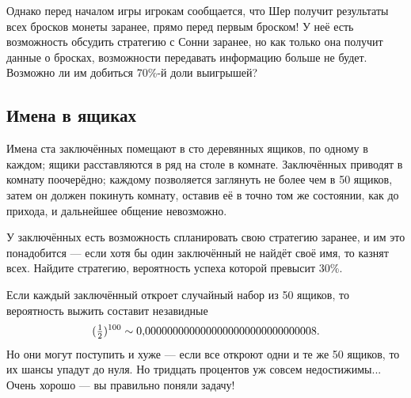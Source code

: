 Однако перед началом игры игрокам сообщается, что Шер получит результаты всех бросков монеты заранее, прямо перед первым броском!
У неё есть возможность обсудить стратегию с Сонни заранее, но как только она получит данные о бросках, возможности передавать информацию больше не будет.
Возможно ли им добиться 70\%-й доли выигрышей?

\subsection*{Имена в ящиках}\label{Имена в ящиках}

Имена ста заключённых помещают в сто деревянных ящиков, по одному в каждом;
ящики расставляются в ряд на столе в комнате.
Заключённых приводят в комнату поочерёдно;
каждому позволяется заглянуть не более чем в 50 ящиков,
затем он должен покинуть комнату, оставив её в точно том же состоянии, как до прихода, и дальнейшее общение невозможно.

У заключённых есть возможность спланировать свою стратегию заранее, и им это понадобится --- если хотя бы один заключённый не найдёт своё имя, то казнят всех.
Найдите стратегию, вероятность успеха которой превысит 30\%.

 Если каждый заключённый откроет случайный набор из 50 ящиков, то вероятность выжить составит незавидные
\[(\tfrac12)^{100}\z\sim 0{,}0000000000000000000000000000008.\]
Но они могут поступить и хуже --- если все откроют одни и те же 50 ящиков, то их шансы упадут до нуля.
Но тридцать процентов уж совсем недостижимы...
Очень хорошо --- вы правильно поняли задачу!
